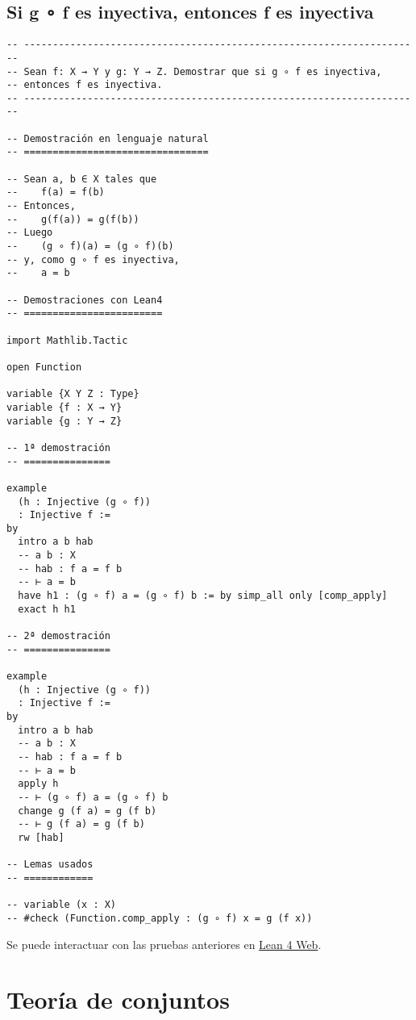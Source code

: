 \section{Si g ∘ f es inyectiva, entonces f es inyectiva}
\label{sec:orgf6f8292}
\begin{verbatim}
-- ---------------------------------------------------------------------
-- Sean f: X → Y y g: Y → Z. Demostrar que si g ∘ f es inyectiva,
-- entonces f es inyectiva.
-- ---------------------------------------------------------------------

-- Demostración en lenguaje natural
-- ================================

-- Sean a, b ∈ X tales que
--    f(a) = f(b)
-- Entonces,
--    g(f(a)) = g(f(b))
-- Luego
--    (g ∘ f)(a) = (g ∘ f)(b)
-- y, como g ∘ f es inyectiva,
--    a = b

-- Demostraciones con Lean4
-- ========================

import Mathlib.Tactic

open Function

variable {X Y Z : Type}
variable {f : X → Y}
variable {g : Y → Z}

-- 1ª demostración
-- ===============

example
  (h : Injective (g ∘ f))
  : Injective f :=
by
  intro a b hab
  -- a b : X
  -- hab : f a = f b
  -- ⊢ a = b
  have h1 : (g ∘ f) a = (g ∘ f) b := by simp_all only [comp_apply]
  exact h h1

-- 2ª demostración
-- ===============

example
  (h : Injective (g ∘ f))
  : Injective f :=
by
  intro a b hab
  -- a b : X
  -- hab : f a = f b
  -- ⊢ a = b
  apply h
  -- ⊢ (g ∘ f) a = (g ∘ f) b
  change g (f a) = g (f b)
  -- ⊢ g (f a) = g (f b)
  rw [hab]

-- Lemas usados
-- ============

-- variable (x : X)
-- #check (Function.comp_apply : (g ∘ f) x = g (f x))
\end{verbatim}
Se puede interactuar con las pruebas anteriores en \href{https://lean.math.hhu.de/\#url=https://raw.githubusercontent.com/jaalonso/Calculemus2/main/src/Inyectiva\_si\_lo\_es\_la\_composicion.lean}{Lean 4 Web}.

\chapter{Teoría de conjuntos}
\label{sec:org4a85268}

